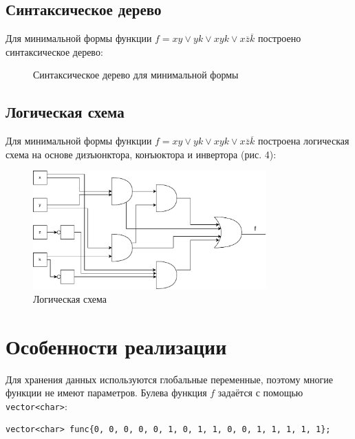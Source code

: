 \documentclass[a4paper]{article}
\theoremstyle{plain}
\theoremstyle{definition*}
\theoremstyle{remark}
\begin{document}
\newpage
\subsection{Синтаксическое дерево}
Для минимальной формы функции $\displaystyle f = xy \vee yk \vee xyk \vee x
\overline{z} \overline{k} $
построено синтаксическое дерево: 

\vspace{1 cm}
\vspace{1 cm}
\begin{figure}[H]
    \centering
    
    \caption{Синтаксическое дерево для минимальной формы}
    \label{fig:}
\end{figure}

\newpage
\subsection{Логическая схема}
Для минимальной формы функции $\displaystyle f = xy \vee yk \vee xyk \vee x
\overline{z} \overline{k} $
построена логическая схема на основе дизъюнктора, конъюктора и
инвертора (рис. 4): 

\vspace{2 cm}
\begin{figure}[H]
    \centering
    \includegraphics[width=0.8\textwidth]{pics/Log-2.pdf}
    \caption{Логическая схема}
\end{figure}

\newpage
\section{Особенности реализации}

Для хранения данных используются глобальные переменные, поэтому многие 
функции не имеют параметров. Булева функция $\displaystyle f$ 
задаётся с помощью \lstinline{vector<char>}:
\begin{lstlisting}
vector<char> func{0, 0, 0, 0, 0, 1, 0, 1, 1, 0, 0, 1, 1, 1, 1, 1};
\end{lstlisting}
\end{document}
